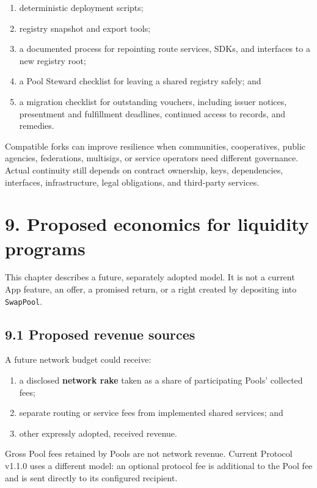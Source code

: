 \documentclass[11pt]{article}
\begin{document}
\begin{enumerate}[leftmargin=*]
\item deterministic deployment scripts;
\item registry snapshot and export tools;
\item a documented process for repointing route services, SDKs, and interfaces to a new registry root;
\item a Pool Steward checklist for leaving a shared registry safely; and
\item a migration checklist for outstanding vouchers, including issuer notices, presentment and fulfillment deadlines, continued access to records, and remedies.
\end{enumerate}
Compatible forks can improve resilience when communities, cooperatives, public agencies, federations, multisigs, or service operators need different governance. Actual continuity still depends on contract ownership, keys, dependencies, interfaces, infrastructure, legal obligations, and third-party services.


\section*{9. Proposed economics for liquidity programs}

This chapter describes a future, separately adopted model. It is not a current App feature, an offer, a promised return, or a right created by depositing into \texttt{SwapPool}.

\subsection*{9.1 Proposed revenue sources}

A future network budget could receive:

\begin{enumerate}[leftmargin=*]
\item a disclosed \textbf{network rake} taken as a share of participating Pools' collected fees;
\item separate routing or service fees from implemented shared services; and
\item other expressly adopted, received revenue.
\end{enumerate}
Gross Pool fees retained by Pools are not network revenue. Current Protocol v1.1.0 uses a different model: an optional protocol fee is additional to the Pool fee and is sent directly to its configured recipient.
\end{document}
